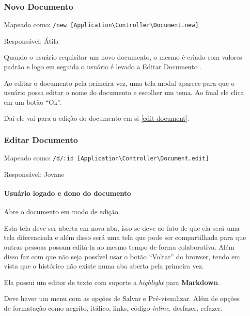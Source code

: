 \subsubsection{Novo Documento}

Mapeado como:
\texttt{/new {[}Application\textbackslash{}Controller\textbackslash{}Document.new{]}}

Responsável: Átila

Quando o usuário requisitar um novo documento, o mesmo é criado com
valores padrão e logo em seguida o usuário é levado a Editar Documento
\label{edit-document}.

Ao editar o documento pela primeira vez, uma tela modal aparece para que
o usuário possa editar o nome do documento e escolher um tema. Ao final
ele clica em um botão ``Ok''.

Daí ele vai para a edição do documento em si \ref{edit-document}.

\subsubsection{Editar Documento \label{edit-document}}

Mapeado como:
\texttt{/d/:id {[}Application\textbackslash{}Controller\textbackslash{}Document.edit{]}}

Responsável: Jovane

\paragraph{Usuário logado e dono do documento}

Abre o documento em modo de edição.

Esta tela deve ser aberta em nova aba, isso se deve ao fato de que ela
será uma tela diferenciada e além disso será uma tela que pode ser
compartilhada para que outras pessoas possam editá-la ao mesmo tempo de
forma colaborativa. Além disso faz com que não seja possível usar o
botão ``Voltar'' do browser, tendo em vista que o histórico não existe
numa aba aberta pela primeira vez.

Ela possui um editor de texto com suporte a \emph{highlight} para
\textbf{Markdown}.

Deve haver um menu com as opções de Salvar e Pré-visualizar. Além de
opções de formatação como negrito, itálico, links, código \emph{inline},
desfazer, refazer.
